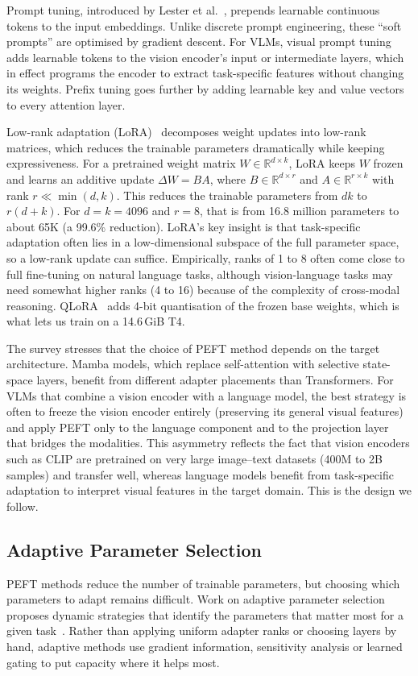 \documentclass[12pt]{report}
\begin{document}
Prompt tuning, introduced by Lester et al.~\cite{lester2021}, prepends learnable continuous tokens to the input embeddings. Unlike discrete prompt engineering, these ``soft prompts'' are optimised by gradient descent. For VLMs, visual prompt tuning adds learnable tokens to the vision encoder's input or intermediate layers, which in effect programs the encoder to extract task-specific features without changing its weights. Prefix tuning goes further by adding learnable key and value vectors to every attention layer.

Low-rank adaptation (LoRA)~\cite{hu2022} decomposes weight updates into low-rank matrices, which reduces the trainable parameters dramatically while keeping expressiveness. For a pretrained weight matrix $W \in \mathbb{R}^{d \times k}$, LoRA keeps $W$ frozen and learns an additive update $\Delta W = BA$, where $B \in \mathbb{R}^{d \times r}$ and $A \in \mathbb{R}^{r \times k}$ with rank $r \ll \min(d,k)$. This reduces the trainable parameters from $dk$ to $r(d+k)$. For $d=k=4096$ and $r=8$, that is from 16.8 million parameters to about 65K (a 99.6\% reduction). LoRA's key insight is that task-specific adaptation often lies in a low-dimensional subspace of the full parameter space, so a low-rank update can suffice. Empirically, ranks of 1 to 8 often come close to full fine-tuning on natural language tasks, although vision-language tasks may need somewhat higher ranks (4 to 16) because of the complexity of cross-modal reasoning. QLoRA~\cite{dettmers2023} adds 4-bit quantisation of the frozen base weights, which is what lets us train on a 14.6\,GiB T4.

The survey stresses that the choice of PEFT method depends on the target architecture. Mamba models, which replace self-attention with selective state-space layers, benefit from different adapter placements than Transformers. For VLMs that combine a vision encoder with a language model, the best strategy is often to freeze the vision encoder entirely (preserving its general visual features) and apply PEFT only to the language component and to the projection layer that bridges the modalities. This asymmetry reflects the fact that vision encoders such as CLIP are pretrained on very large image--text datasets (400M to 2B samples) and transfer well, whereas language models benefit from task-specific adaptation to interpret visual features in the target domain. This is the design we follow.

\subsection{Adaptive Parameter Selection}
PEFT methods reduce the number of trainable parameters, but choosing which parameters to adapt remains difficult. Work on adaptive parameter selection proposes dynamic strategies that identify the parameters that matter most for a given task~\cite{adaptive2024}. Rather than applying uniform adapter ranks or choosing layers by hand, adaptive methods use gradient information, sensitivity analysis or learned gating to put capacity where it helps most.
\end{document}
